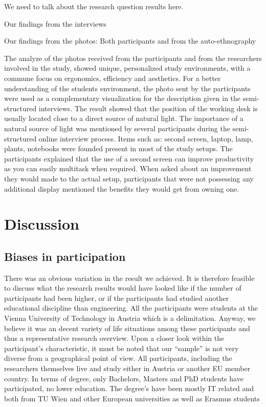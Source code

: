 \documentclass{sigchi}
\begin{document}
We need to talk about the research question results here.

Our findings from the interviews

Our findings from the photos: Both participants and from the auto-ethnography 

The analyze of the photos received from the participants and from the researchers involved in the study, showed unique, personalized study environments,  with a commune focus on ergonomics, efficiency and aesthetics. For a better understanding of the students environment, the photo sent by the participants were used as a complementary visualization for the description given in the semi-structured interviews. The result showed that the position of the working desk is usually located close to a direct source of natural light. The importance of a natural source of light was mentioned by several participants during the semi-structured online interview process. Items such as: second screen, laptop, lamp, plants, notebooks were founded present in most of the study setups. The participants explained that the use of a second screen can improve productivity as you can easily multitask when required. When asked about an improvement they would made to the actual setup, participants that were not possessing any additional display mentioned the benefits they would get from owning one.

\section{Discussion}

\subsection{Biases in participation}
There was an obvious variation in the result we achieved. It is therefore feasible to discuss what the research results would have looked like if the number of participants had been higher, or if the participants had studied another educational discipline than engineering. All the participants were students at the Vienna University of Technology in Austria which is a delimitation. Anyway, we believe it was an decent variety of life situations among these participants and thus a representative research overview.
Upon a closer look within the participant’s characteristic, it must be noted that our “sample” is not very diverse from a geographical point of view. All participants, including the researchers themselves live and study either in Austria or another EU member country. In terms of degree, only Bachelors, Masters and PhD students have participated, no lower education. The degree’s have been mostly IT related and both from TU Wien and other European universities as well as Erasmus students
\end{document}
